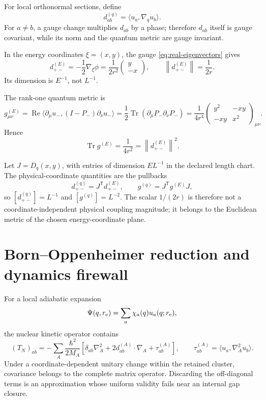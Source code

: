 \documentclass[11pt,a4paper]{article}
\theoremstyle{definition}
\theoremstyle{plain}
\theoremstyle{remark}
\newcommand{\norm}[1]{\left\lVert #1\right\rVert}
\newcommand{\Tr}{\operatorname{Tr}}
\begin{document}
For local orthonormal sections, define
\[
d_{ab}^{(q)}=\langle u_a,\nabla_q u_b\rangle .
\]
For \(a\ne b\), a gauge change multiplies \(d_{ab}\) by a phase;
therefore \(d_{ab}\) itself is gauge covariant, while its norm and the
quantum metric are gauge invariant.

In the energy coordinates \(\xi=(x,y)\), the gauge
\cref{eq:real-eigenvectors} gives
\begin{equation}\label{eq:energy-nac}
d_{+-}^{(E)}
=-\frac12\nabla_\xi\phi
=\frac1{2r^2}\begin{pmatrix}y\\-x\end{pmatrix},
\qquad
\norm{d_{+-}^{(E)}}=\frac1{2r}.
\end{equation}
Its dimension is \(E^{-1}\), not \(L^{-1}\).

The rank-one quantum metric is
\begin{equation}\label{eq:quantum-metric}
g^{(E)}_{\mu\nu}
=\operatorname{Re}\langle\partial_\mu u_-,
(I-P_-)\partial_\nu u_-\rangle
=\frac12\Tr(\partial_\mu P_-\partial_\nu P_-)
=\frac1{4r^4}
\begin{pmatrix}
y^2&-xy\\
-xy&x^2
\end{pmatrix}_{\mu\nu}.
\end{equation}
Hence
\begin{equation}\label{eq:metric-trace}
\Tr g^{(E)}=\frac1{4r^2}
=\norm{d_{+-}^{(E)}}^2.
\end{equation}

Let \(J=D_q(x,y)\), with entries of dimension \(EL^{-1}\) in the
declared length chart. The physical-coordinate quantities are the
pullbacks
\begin{equation}\label{eq:physical-pullback}
d_{+-}^{(q)}=J^\mathsf T d_{+-}^{(E)},\qquad
g^{(q)}=J^\mathsf T g^{(E)}J,
\end{equation}
so \([d_{+-}^{(q)}]=L^{-1}\) and \([g^{(q)}]=L^{-2}\).
The scalar \(1/(2r)\) is therefore not a coordinate-independent
physical coupling magnitude; it belongs to the Euclidean metric of
the chosen energy-coordinate plane.

\section{Born--Oppenheimer reduction and dynamics firewall}

For a local adiabatic expansion
\[
\Psi(q,r_{\rm e})=\sum_a\chi_a(q)u_a(q;r_{\rm e}),
\]
the nuclear kinetic operator contains
\begin{equation}\label{eq:kinetic-couplings}
(T_N)_{ab}
=-\sum_A\frac{\hbar^2}{2M_A}
\left[
\delta_{ab}\nabla_A^2
+2d_{ab}^{(A)}\cdot\nabla_A
+\tau_{ab}^{(A)}
\right],
\qquad
\tau_{ab}^{(A)}=\langle u_a,\nabla_A^2u_b\rangle .
\end{equation}
Under a coordinate-dependent unitary change within the retained
cluster, covariance belongs to the complete matrix operator.
Discarding the off-diagonal terms is an approximation whose uniform
validity fails near an internal gap closure.
\end{document}
